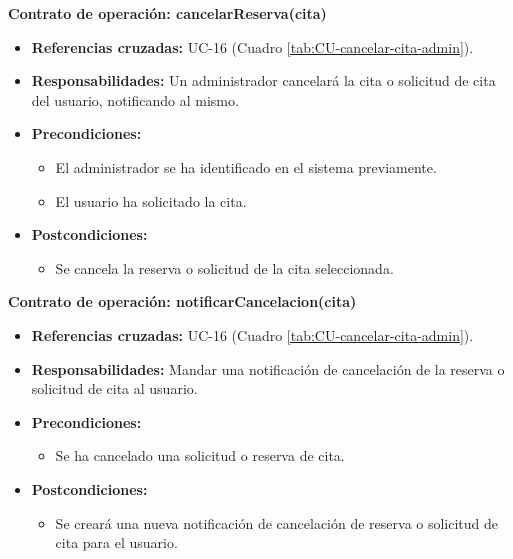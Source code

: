 \textbf{Contrato de operación: cancelarReserva(cita)}
\begin{itemize}
\item \textbf{Referencias cruzadas:} UC-16 (Cuadro \ref{tab:CU-cancelar-cita-admin}).
\item \textbf{Responsabilidades:} Un administrador cancelará la cita o solicitud de cita del usuario, notificando al mismo.
\item \textbf{Precondiciones:} 
 \begin{itemize}
\item El administrador se ha identificado en el sistema previamente.
\item El usuario ha solicitado la cita.
\end {itemize}
\item \textbf{Postcondiciones:} 
 \begin{itemize}
\item Se cancela la reserva o solicitud de la cita seleccionada.
\end {itemize}
\end {itemize}

\textbf{Contrato de operación: notificarCancelacion(cita)}
\begin{itemize}
\item \textbf{Referencias cruzadas:} UC-16 (Cuadro \ref{tab:CU-cancelar-cita-admin}).
\item \textbf{Responsabilidades:} Mandar una notificación de cancelación de la reserva o solicitud de cita al usuario.
\item \textbf{Precondiciones:} 
 \begin{itemize}
\item Se ha cancelado una solicitud o reserva de cita.
\end {itemize}
\item \textbf{Postcondiciones:} 
 \begin{itemize}
\item Se creará una nueva notificación de cancelación de reserva o solicitud de cita para el usuario.
\end {itemize}
\end {itemize}

